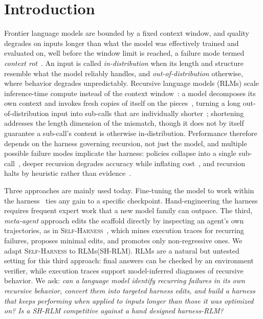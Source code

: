 \documentclass[letterpaper]{article} %
\newcommand{\rlms}{\textsc{RLM}s\xspace}
\newcommand{\sh}{\textsc{Self-Harness}\xspace}
\begin{document}
\section{Introduction}
Frontier language models are bounded by a fixed context window, and quality degrades on
inputs longer than what the model was effectively trained and evaluated on, well before the
window limit is reached, a failure mode termed \emph{context rot}~\citep{hong2025contextrot}.
An input is called \emph{in-distribution} when its length and structure resemble what the model reliably handles, and \emph{out-of-distribution} otherwise, where behavior degrades unpredictably. Recursive language models (\rlms) scale inference-time compute instead of the
context window~\citep{snell2024scaling}: a model decomposes its own context and invokes fresh
copies of itself on the pieces~\citep{zhang2025rlm}, turning a long out-of-distribution input
into sub-calls that are individually shorter~\citep{zhang2026harness}; shortening addresses
the length dimension of the mismatch, though it does not by itself guarantee a sub-call's
content is otherwise in-distribution.
Performance therefore depends on the harness governing recursion, not just the model, and multiple possible failure modes implicate the harness:
policies collapse into a single sub-call~\citep{zhang2026harness},
deeper recursion degrades accuracy while inflating cost~\citep{wang2026overthink}, and recursion
halts by heuristic rather than evidence~\citep{guha2026termination}.

Three approaches are mainly used today.
Fine-tuning the model to work within the
harness~\citep{zhang2026harness,yang2026recursive} ties any gain to a specific checkpoint.
Hand-engineering the harness~\citep{alizadeh2026srlm,roy2026ycombinator,lumer2026rah} requires
frequent expert work that a new model family can outpace.
The third, \emph{meta-agent} approach edits the scaffold directly by inspecting an agent's own trajectories, as in \sh{}~\citep{zhang2026selfharness}, which mines execution traces for recurring failures, proposes minimal edits, and promotes only non-regressive ones. We adapt \sh{} to \rlms (SH-RLM). \rlms are a natural but untested setting for this third approach: final answers can be checked by an environment verifier, while execution traces support model-inferred diagnoses of recursive behavior.
We ask: \emph{can a language model
identify recurring failures in its own recursive behavior, convert them into targeted harness
edits, and build a harness that keeps performing when applied to inputs longer than those it was optimized on? Is a SH-RLM competitive against a hand designed harness-RLM?}
\end{document}
